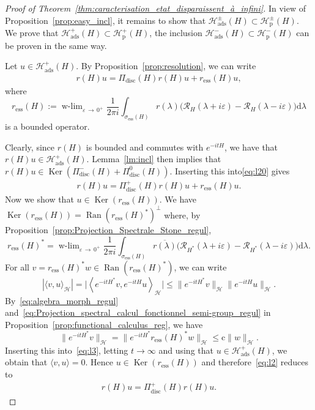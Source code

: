 \documentclass[10pt]{amsart}
\theoremstyle{definition}\newtheorem{defi}[theo]{Definition}\newtheorem{rema}[theo]{Remark}\newtheorem{exam}[theo]{Example}\newtheorem{exem}[theo]{Example}\newtheorem{nota}[theo]{Notation}
\newcommand{\Hi}{\mathcal{H}}
\newcommand{\ess}{\mathrm{ess}}
\newcommand{\rmp}{\mathrm{p}}
\newcommand{\ads}{\mathrm{ads}}
\newcommand{\rmc}{\mathrm{c}}
\newcommand{\rmd}{\mathrm{d}}
\newcommand{\disc}{\mathrm{disc}}
\newcommand{\Res}{\mathcal{R}}
\DeclareMathOperator{\wlim}{w-lim}
\DeclareMathOperator{\Ran}{Ran}
\DeclareMathOperator{\Ker}{Ker}
\begin{document}
\begin{proof}[Proof of Theorem~\ref{thm:caracterisation_etat_disparaissent_à_infini}]
In view of Proposition~\ref{prop:easy_incl}, it remains to show that $\Hi_\ads^\pm(H)\subset\Hi_\rmp^\pm(H)$. We prove that $\Hi_\ads^+(H)\subset\Hi_\rmp^+(H)$, the inclusion $\Hi_\ads^-(H)\subset\Hi_\rmp^-(H)$ can be proven in the same way.


Let $u\in\Hi_\ads^+(H)$. By Proposition~\ref{prop:resolution}, we can write
\begin{align}\label{eq:l20}
r(H) u = \Pi_{\disc}(H)r(H)u + r_{\ess}(H)u,
\end{align}
where
\begin{equation*}
r_{\ess}(H):=\wlim_{\varepsilon\,\rightarrow\,0^+}\frac{1}{2\pi i}\int_{\sigma_{\ess}(H)}r(\lambda)\big(\Res_{H}(\lambda+i\varepsilon)-\Res_{H}(\lambda-i\varepsilon)\big)\rmd \lambda
\end{equation*}
is a bounded operator.

Clearly, since $r(H)$ is bounded and commutes with $e^{-itH}$, we have that $r(H)u\in\Hi_\ads^+(H)$. Lemma~\ref{lm:incl} then implies that $r(H)u\in\Ker(\Pi_{\disc}^-(H)+\Pi_{\disc}^0(H))$. Inserting this into\eqref{eq:l20} gives
\begin{align}\label{eq:l2}
r(H) u = \Pi_{\disc}^+(H)r(H)u + r_{\ess}(H)u.
\end{align}
Now we show that $u\in\Ker(r_{\ess}(H))$. We have $\Ker(r_{\ess}(H))=\Ran(r_{\ess}(H)^*)^\perp$ where, by Proposition~\ref{prop:Projection_Spectrale_Stone_regul},
\begin{equation*}
r_{\ess}(H)^*=\wlim_{\varepsilon\,\rightarrow\,0^+}\frac{1}{2\pi i}\int_{\sigma_{\ess}(H)}\overline{r(\lambda)}\big(\Res_{H^*}(\lambda+i\varepsilon)-\Res_{H^*}(\lambda-i\varepsilon)\big)\rmd \lambda.
\end{equation*}
For all $v=r_{\ess}(H)^*w\in \Ran(r_{\ess}(H)^*)$, we can write
\begin{equation}\label{eq:l3}
|\langle v,u\rangle_\Hi|=\big|\left\langle e^{-itH^*}v,e^{-itH}u\right\rangle_\Hi\big|\le\big\|e^{-itH^*}v\big\|_\Hi\big\|e^{-itH}u\big\|_\Hi.
\end{equation}
By~\eqref{eq:algebra_morph_regul} and~\eqref{eq:Projection_spectral_calcul_fonctionnel_semi-group_regul} in Proposition~\ref{prop:functional_calculus_reg}, we have
\begin{equation*}
\big\|e^{-itH^*}v\big\|_\Hi=\big\|e^{-itH^*}r_{\ess}(H)^*w\big\|_\Hi\le\rmc\|w\|_\Hi.
\end{equation*}
Inserting this into~\eqref{eq:l3}, letting $t\to\infty$ and using that $u\in\Hi_\ads^+(H)$, we obtain that $\langle v,u\rangle=0$. Hence $u\in\Ker(r_{\ess}(H))$ and therefore~\eqref{eq:l2} reduces to
\begin{align}\label{eq:l4}
r(H) u = \Pi_{\disc}^+(H)r(H)u.
\end{align}


\end{proof}
\end{document}
